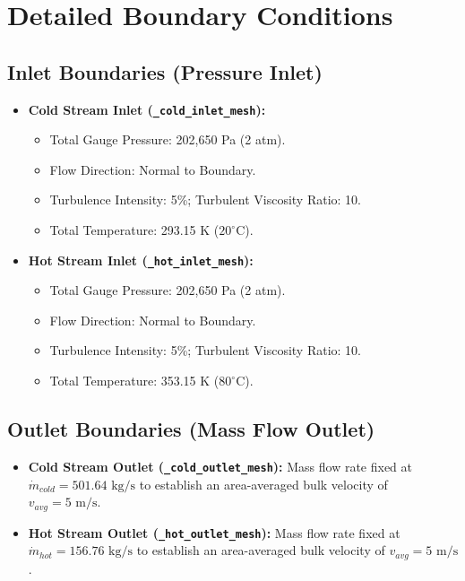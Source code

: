 \documentclass[12pt,a4paper]{report}
\begin{document}
\section{Detailed Boundary Conditions}

\subsection{Inlet Boundaries (Pressure Inlet)}
\begin{itemize}
    \item \textbf{Cold Stream Inlet (\texttt{\_cold\_inlet\_mesh}):}
    \begin{itemize}
        \item Total Gauge Pressure: 202,650 Pa (2 atm).
        \item Flow Direction: Normal to Boundary.
        \item Turbulence Intensity: 5\%; Turbulent Viscosity Ratio: 10.
        \item Total Temperature: 293.15 K ($20^\circ\text{C}$).
    \end{itemize}
    \item \textbf{Hot Stream Inlet (\texttt{\_hot\_inlet\_mesh}):}
    \begin{itemize}
        \item Total Gauge Pressure: 202,650 Pa (2 atm).
        \item Flow Direction: Normal to Boundary.
        \item Turbulence Intensity: 5\%; Turbulent Viscosity Ratio: 10.
        \item Total Temperature: 353.15 K ($80^\circ\text{C}$).
    \end{itemize}
\end{itemize}

\subsection{Outlet Boundaries (Mass Flow Outlet)}
\begin{itemize}
    \item \textbf{Cold Stream Outlet (\texttt{\_cold\_outlet\_mesh}):} Mass flow rate fixed at $\dot{m}_{cold} = 501.64\text{ kg/s}$ to establish an area-averaged bulk velocity of $v_{avg} = 5\text{ m/s}$.
    \item \textbf{Hot Stream Outlet (\texttt{\_hot\_outlet\_mesh}):} Mass flow rate fixed at $\dot{m}_{hot} = 156.76\text{ kg/s}$ to establish an area-averaged bulk velocity of $v_{avg} = 5\text{ m/s}$.
\end{itemize}
\end{document}
